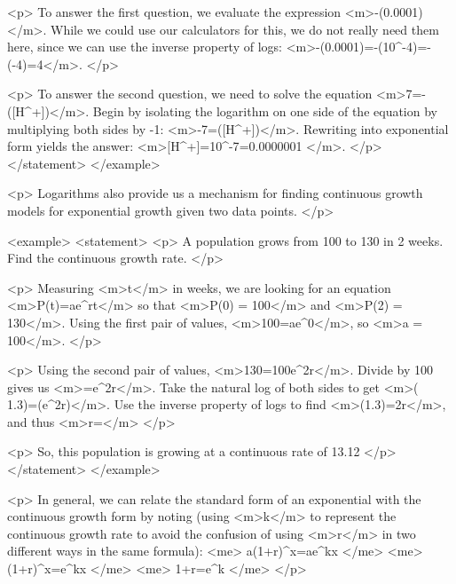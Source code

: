                 <p>
                    To answer the first question, we evaluate the expression <m>-\log⁡(0.0001)</m>.
                    While we could use our calculators for this, we do not really need them here, since we can use the inverse property of logs: <m>-\log⁡(0.0001)=-\log⁡(10^{-4})=-(-4)=4</m>.
                </p>

                <p>
                    To answer the second question, we need to solve the equation <m>7=-\log⁡([H^{+}])</m>.
                    Begin by isolating the logarithm on one side of the equation by multiplying both sides by -1: <m>-7=\log⁡([H^{+}])</m>.
                    Rewriting into exponential form yields the answer: <m>[H^{+}]=10^{-7}=0.0000001 </m>.
                </p>
            </statement>
        </example>

        <p>
            Logarithms also provide us a mechanism for finding continuous growth models for exponential growth given two data points.
        </p>

        <example>
            <statement>
                <p>
                    A population grows from 100 to 130 in 2 weeks.
                    Find the continuous growth rate.
                </p>

                <p>
                    Measuring <m>t</m> in weeks, we are looking for an equation <m>P(t)=ae^{rt}</m> so that <m>P(0) = 100</m> and <m>P(2) = 130</m>.
                    Using the first pair of values, <m>100=ae^{0}</m>, so <m>a = 100</m>.
                </p>

                <p>
                    Using the second pair of values, <m>130=100e^{2r}</m>.
                    Divide by 100 gives us <m>=e^{2r}</m>.
                    Take the natural log of both sides to get <m>\ln⁡( 1.3)=\ln⁡(e^{2r})</m>.
                    Use the inverse property of logs to find <m>\ln⁡(1.3)=2r</m>, and thus <m>r=</m>
                </p>

                <p>
                    So, this population is growing at a continuous rate of 13.12%
                </p>
            </statement>
        </example>

        <p>
            In general, we can relate the standard form of an exponential with the continuous growth form by noting (using <m>k</m> to represent the continuous growth rate to avoid the confusion of using <m>r</m> in two different ways in the same formula):
            <me>
                a(1+r)^{x}=ae^{kx}
            </me>
            <me>
                (1+r)^{x}=e^{kx}
            </me>
            <me>
                1+r=e^{k}
            </me>
        </p>

